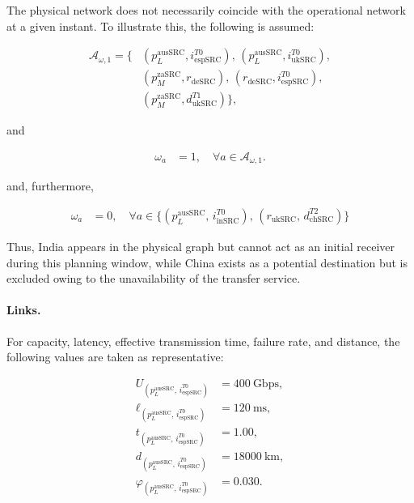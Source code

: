 \documentclass[a4paper,fleqn]{cas-dc}
\newcommand{\A}{\mathcal{A}}
\begin{document}
The physical network does not necessarily coincide with the operational network at a given instant. To illustrate this, the following is assumed:


\begin{align*}
\A_{\omega,1} = \bigl\{ 
& (p_L^{\mathrm{ausSRC}},i_{\mathrm{espSRC}}^{T0}),\,
  (p_L^{\mathrm{ausSRC}},i_{\mathrm{ukSRC}}^{T0}), \\
& (p_M^{\mathrm{zaSRC}},r_{\mathrm{deSRC}}),\,
  (r_{\mathrm{deSRC}},i_{\mathrm{espSRC}}^{T0}), \\
& (p_M^{\mathrm{zaSRC}},d_{\mathrm{ukSRC}}^{T1}) \bigr\},
\end{align*}

and

\begin{align*}
\omega_a &= 1, \quad \forall a \in \A_{\omega,1}.
\end{align*}

and, furthermore,



\begin{align*}
\omega_a &= 0, \quad \forall a \in \bigl\{ (p_L^{\mathrm{ausSRC}},\, i_{\mathrm{inSRC}}^{T0}),\, (r_{\mathrm{ukSRC}},\, d_{\mathrm{chSRC}}^{T2}) \bigr\}
\end{align*}


Thus, India appears in the physical graph but cannot act as an initial receiver during this planning window, while China exists as a potential destination but is excluded owing to the unavailability of the transfer service.

\paragraph{Links.} 

For capacity, latency, effective transmission time, failure rate, and distance, the following values are taken as representative:


\begin{align*}
U_{(p_L^{\mathrm{ausSRC}},\, i_{\mathrm{espSRC}}^{T0})} &= 400\ \text{Gbps}, \\[1ex]
\ell_{(p_L^{\mathrm{ausSRC}},\, i_{\mathrm{espSRC}}^{T0})} &= 120\ \text{ms}, \\[1ex]
t_{(p_L^{\mathrm{ausSRC}},\, i_{\mathrm{espSRC}}^{T0})} &= 1.00, \\[1ex]
d_{(p_L^{\mathrm{ausSRC}},\, i_{\mathrm{espSRC}}^{T0})} &= 18000\ \text{km}, \\[1ex]
\varphi_{(p_L^{\mathrm{ausSRC}},\, i_{\mathrm{espSRC}}^{T0})} &= 0.030.
\end{align*}
\end{document}
